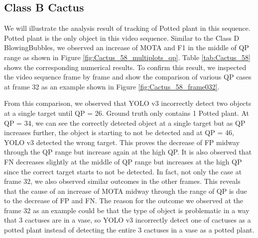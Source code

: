 \subsection{Class B Cactus}
We will illustrate the analysis result of tracking of Potted plant in this sequence. Potted plant is the only object in this video sequence. Similar to the Class D BlowingBubbles, we observed an increase of MOTA and F1 in the middle of QP range as shown in Figure \ref{fig:Cactus_58_multiplots_qp}. Table \ref{tab:Cactus_58} shows the corresponding numerical results. To confirm this result, we inspected the video sequence frame by frame and show the comparison of various QP cases at frame 32 as an example shown in Figure \ref{fig:Cactus_58_frame032}.



From this comparison, we observed that YOLO v3 incorrectly detect two objects at a single target until QP = 26. Ground truth only contains 1 Potted plant. At QP = 34, we can see the correctly detected object at a single target but as QP increases further, the object is starting to not be detected and at QP = 46, YOLO v3 detected the wrong target. This proves the decrease of FP midway through the QP range but increase again at the high QP. It is also observed that FN decreases slightly at the middle of QP range but increases at the high QP since the correct target starts to not be detected. In fact, not only the case at frame 32, we also observed similar outcomes in the other frames. This reveals that the cause of an increase of MOTA midway through the range of QP is due to the decrease of FP and FN. The reason for the outcome we observed at the frame 32 as an example could be that the type of object is problematic in a way that 3 cactuses are in a vase, so YOLO v3 incorrectly detect one of cactuses as a potted plant instead of detecting the entire 3 cactuses in a vase as a potted plant.


